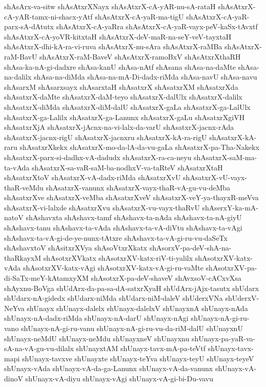 {shAsArx-va-sitw
shAsAtxrXNayx
shAsAtxrX-cA-yAR-nu-sA-rataH
shAsAtxrX-cA-yAR-tamx-ni-shacx-yAtf
shAsAtxrX-cA-yaR-ma-tigU
shAsAtxrX-cA-yaR-parx-sA-dAtutx
shAsAtxrX-cA-yaRra
shAsAtxrX-cA-yaR-vayx-peV-kaSx-tAvxtf
shAsAtxrX-cA-yoVR-kitxtaH
shAsAtxrX-deV-maR-na-seY-veV-tayxtaH
shAsAtxrX-dhi-kA-ra-vi-ruva
shAsAtxrX-nu-sAra
shAsAtxrX-raMBa
shAsAtxrX-raM-BavU
shAsAtxrX-raM-BaveV
shAsAtxrX-ramoBxV
shAsAtxrXthaRH
shAsa-ka-nA-gi-dadxre
shAsa-kanU
shAsa-nAtf
shAsana
shAsa-na-daMte
shAsa-na-dalilx
shAsa-na-diMda
shAsa-na-mA-Di-dadx-riMda
shAsa-navU
shAsa-navu
shAsarxM
shAsarxsayx
shAsarxtaH
shAsatxrX
shAsatxrXM
shAsatxrXda
shAsatxrX-daMte
shAsatxrX-daM-teyo
shAsatxrX-dalUlx
shAsatxrX-dalilx
shAsatxrX-diMda
shAsatxrX-diM-dalU
shAsatxrX-gaLa
shAsatxrX-ga-LalUlx
shAsatxrX-ga-Lalilx
shAsatxrX-ga-Lanunx
shAsatxrX-gaLu
shAsatxrXgiVH
shAsatxrXjA
shAsatxrX-jAcnx-na-vi-lalx-da-varU
shAsatxrX-jacnx-rAda
shAsatxrX-jacnx-rigU
shAsatxrX-jacnxru
shAsatxrX-kA-ra-rigU
shAsatxrX-kA-raru
shAsatxrXkekx
shAsatxrX-mo-da-lA-da-vu-gaLa
shAsatxrX-pa-Tha-Nakekx
shAsatxrX-parx-si-dadhx-vA-dadudx
shAsatxrX-ra-ca-neyu
shAsatxrX-saM-ma-ta-vAda
shAsatxrX-sa-vaR-saM-ba-nodhxV-va-taRteV
shAsatxrXtaH
shAsatxrXtoV
shAsatxrX-vA-dadx-riMda
shAsatxrXvU
shAsatxrX-vU-vayx-thaR-veMdu
shAsatxrX-vanunx
shAsatxrX-vayx-thaR-vA-gu-vu-deMba
shAsatxrXve
shAsatxrX-veMba
shAsatxrXveV
shAsatxrX-veY-ya-thayxR-meVva
shAsatxrX-vi-lalxde
shAsatxrXvu
shAsatxrX-vu-vayx-thaRvU
shAserxY-ka-mA-natoV
shAshavxta
shAshavx-tamf
shAshavx-ta-nAda
shAshavx-ta-nA-giyU
shAshavx-tanu
shAshavx-ta-vAda
shAshavx-ta-vA-diVtu
shAshavx-ta-vAgi
shAshavx-ta-vA-gi-de-ye-nunx-tAtxre
shAshavx-ta-vA-gi-ru-vu-daSeTx
shAshavxtoV
shAsitxrXVya
shAsoVtxrXkatx
shAsorxV-pa-deV-shA-na-thaRkayxM
shAsotxrXVkatx
shAsotxrXV-katx-riV-ti-yalilx
shAsotxrXV-katx-vAda
shAsotxrXV-katx-vAgi
shAsotxrXV-katx-vA-gi-ru-vaMte
shAsotxrXV-pa-di-SaTx-meY-kAtamxyXM
shAsotxrX-pa-deV-shaveV
shAvxsoV-cACxvXsa
shAyxnu-BoVga
shUdArx-da-pa-sa-dA-satxrXyaH
shUdArx-jAjx-tasutx
shUdarx
shUdarx-nA-gidedx
shUdarx-niMda
shUdarx-niM-daleV
shUderxVNa
shUderxV-NeYva
shUnayx
shUnayx-dalelx
shUnayx-dalelxV
shUnayxnA
shUnayx-nAda
shUnayx-nA-dadx-riMda
shUnayx-nA-darU
shUnayx-nAgi
shUnayx-nA-gi-ru-vano
shUnayx-nA-gi-ru-vanu
shUnayx-nA-gi-ru-vu-da-riM-dalU
shUnayxnU
shUnayx-neMdU
shUnayx-neMdu
shUnayxneV
shUnayxnu
shUnayx-pa-yaR-va-sA-na-vA-gu-vu-dilalx
shUnayxtAM
shUnayx-tavx-mA-pa-teVtf
shUnayx-tavx-mapi
shUnayx-tavxve
shUnayxte
shUnayx-teYva
shUnayx-teyU
shUnayx-teyeV
shUnayx-vAda
shUnayx-vA-da-ga-Lanunx
shUnayx-vA-da-vanunx
shUnayx-vA-dinoV
shUnayx-vA-diyu
shUnayx-vAgi
shUnayx-vA-gi-bi-Du-vavu
}
